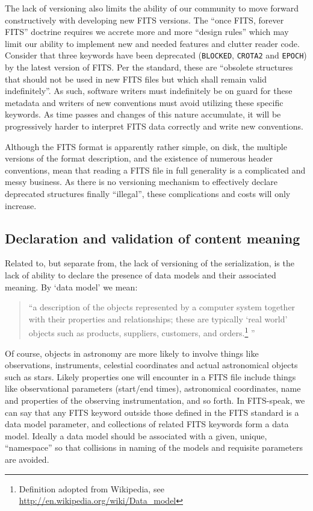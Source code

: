 \documentclass[final,authoryear,5p,times,twocolumn]{elsarticle}
\begin{document}
{{The lack of versioning also limits the ability of our community to
move forward constructively with developing new FITS versions.
The ``once FITS, forever FITS'' doctrine requires we accrete
more and more ``design rules'' which may limit our ability to implement
new and needed features and clutter reader code. Consider that three keywords
have been deprecated
(\texttt{BLOCKED}, \texttt{CROTA2} and \texttt{EPOCH}) by the latest version
of FITS. Per the standard, these are ``obsolete structures that should not be
used in new FITS files but which shall remain valid indefinitely''.
As such, software writers must indefinitely be on guard for these metadata
and writers of new conventions must avoid utilizing these specific keywords.
As time passes and changes of this nature accumulate, it will be progressively
harder to interpret FITS data correctly and write new conventions.


Although the FITS format is apparently rather simple, on disk, the
multiple versions of the format description, and the existence of
numerous header conventions, mean that reading a FITS file in full
generality is a complicated and messy business.  As there is no
versioning mechanism to effectively declare deprecated structures
finally ``illegal'', these complications and costs will only
increase.


\subsection{Declaration and validation of content meaning}
\label{subsection_semantic_validation_and_declaration}


Related to, but separate from, the lack of versioning of the
serialization, is the lack of ability to declare the presence of data
models and their associated meaning.  By `data model' we
mean:


\begin{quote}
``a description of the objects represented by a computer system
together with their properties and relationships; these are typically
`real world' objects such as products, suppliers, customers, and
orders.\footnote{Definition adopted from Wikipedia, see
\url{http://en.wikipedia.org/wiki/Data\_model}}
''
\end{quote}


Of course, objects in astronomy are more likely to involve things like
observations, instruments, celestial coordinates and actual astronomical
objects such as stars. Likely properties one will encounter in a FITS
file include things like observational parameters (start/end times),
astronomical coordinates, name and properties of the observing
instrumentation, and so forth. In FITS-speak, we can say that any FITS
keyword outside those defined in the FITS standard is a data model
parameter, and collections of related FITS keywords form a data model.
Ideally a data model should be associated with a given, unique,
``name\-space'' so that collisions in naming of the models and requisite
parameters are avoided.


}}
\end{document}
